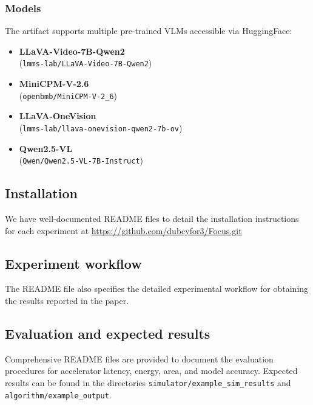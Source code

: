 \subsubsection{Models}

The artifact supports multiple pre-trained VLMs accessible via HuggingFace:

\begin{itemize}
  \item \textbf{LLaVA-Video-7B-Qwen2} \\
  (\texttt{lmms-lab/LLaVA-Video-7B-Qwen2})
  \item \textbf{MiniCPM-V-2.6} \\
  (\texttt{openbmb/MiniCPM-V-2\_6})
  \item \textbf{LLaVA-OneVision} \\
  (\texttt{lmms-lab/llava-onevision-qwen2-7b-ov})
  \item \textbf{Qwen2.5-VL} \\
  (\texttt{Qwen/Qwen2.5-VL-7B-Instruct})
\end{itemize}

\subsection{Installation}

We have well-documented README files to detail the installation instructions for each experiment at \href{https://github.com/dubcyfor3/Focus.git}{https://github.com/dubcyfor3/Focus.git}

\subsection{Experiment workflow}

The README file also specifies the detailed experimental workflow for obtaining the results reported in the paper.


\subsection{Evaluation and expected results}

Comprehensive README files are provided to document the evaluation procedures for accelerator latency, energy, area, and model accuracy. Expected results can be found in the directories \texttt{simulator/example\_sim\_results} and \texttt{algorithm/example\_output}.

